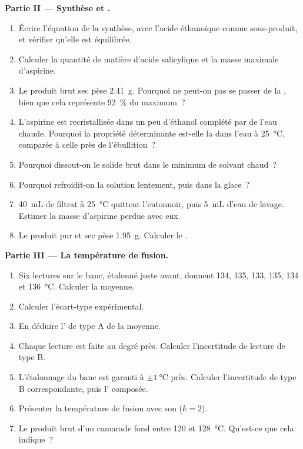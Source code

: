 \begin{problem}
\noindent\textbf{Partie II --- Synthèse et .}
\begin{enumerate}[resume]
  \item Écrire l'équation de la synthèse, avec l'acide éthanoïque
         comme sous-produit, et vérifier qu'elle est
        équilibrée.
  \item Calculer la quantité de matière d'acide salicylique et la masse
        maximale d'aspirine.
  \item Le produit brut sec pèse \qty{2.41}{g}. Pourquoi ne peut-on pas
        se passer de la , bien que cela représente
        \qty{92}{\percent} du maximum~?
  \item L'aspirine est recristallisée dans un peu d'éthanol complété par
        de l'eau chaude. Pourquoi la propriété déterminante est-elle la
         dans l'eau à \qty{25}{\celsius}, comparée à celle près
        de l'ébullition~?
  \item Pourquoi dissout-on le solide brut dans le minimum de solvant
        chaud~?
  \item Pourquoi refroidit-on la solution lentement, puis dans la glace~?
  \item \qty{40}{mL} de filtrat à \qty{25}{\celsius} quittent
        l'entonnoir, puis \qty{5}{mL} d'eau de lavage. Estimer la masse
        d'aspirine perdue avec eux.
  \item Le produit pur et sec pèse \qty{1.95}{g}. Calculer le .
\end{enumerate}

\noindent\textbf{Partie III --- La température de fusion.}
\begin{enumerate}[resume]
  \item Six lectures sur le banc, étalonné juste avant, donnent 134, 135,
        133, 135, 134 et \qty{136}{\celsius}. Calculer la moyenne.
  \item Calculer l'écart-type expérimental.
  \item En déduire l' de type A de la moyenne.
  \item Chaque lecture est faite au degré près. Calculer l'incertitude
        de lecture de type B.
  \item L'étalonnage du banc est garanti à
        $\pm\qty{1}{\celsius}$ près. Calculer l'incertitude de type B
        correspondante, puis l' composée.
  \item Présenter la température de fusion avec son 
        ($k = 2$).
  \item Le produit brut d'un camarade fond entre 120 et
        \qty{128}{\celsius}. Qu'est-ce que cela indique~?
\end{enumerate}


\end{problem}

